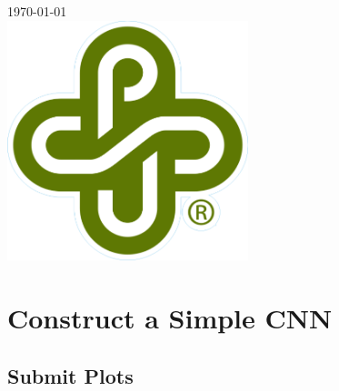 \documentclass[12pt]{article}
\begin{document}
\begin{titlepage}
		
		
		{\large \today}\\[0.7cm] %
		
		
		\includegraphics[width=7cm]{PSU_LOGO.png}\\[.5cm] %
		
		
		\vfill %
		
	\end{titlepage}
	
	
	
	\section{Construct a Simple CNN}
		\subsection{Submit Plots}
		
\end{document}
